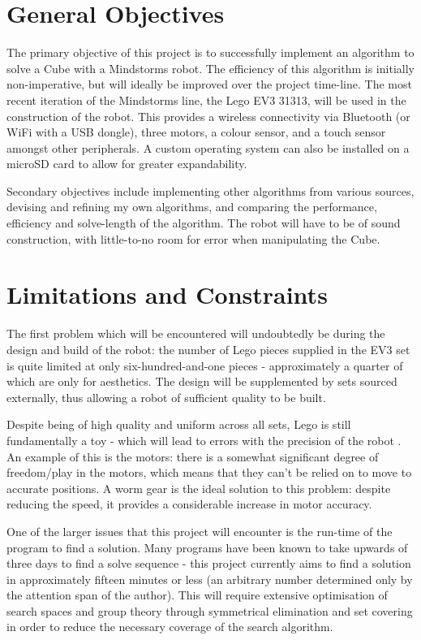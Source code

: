 \documentclass{report}
\begin{document}
    \section{General Objectives}
    The primary objective of this project is to successfully implement an algorithm to solve a Cube with a Mindstorms robot. The efficiency of this algorithm is initially non-imperative, but will ideally be improved over the project time-line. The most recent iteration of the Mindstorms line, the Lego EV3 31313, will be used in the construction of the robot. This provides a wireless connectivity via Bluetooth (or WiFi with a USB dongle), three motors, a colour sensor, and a touch sensor amongst other peripherals. A custom operating system can also be installed on a microSD card to allow for greater expandability.
    
    Secondary objectives include implementing other algorithms from various sources, devising and refining my own algorithms, and comparing the performance, efficiency and solve-length of the algorithm. The robot will have to be of sound construction, with little-to-no room for error when manipulating the Cube.
    
    \section{Limitations and Constraints}
    The first problem which will be encountered will undoubtedly be during the design and build of the robot: the number of Lego pieces supplied in the EV3 set is quite limited at only six-hundred-and-one pieces - approximately a quarter of which are only for aesthetics. The design will  be supplemented by sets sourced externally, thus allowing a robot of sufficient quality to be built.
    
    Despite being of high quality and uniform across all sets, Lego is still fundamentally a toy - which will lead to errors with the precision of the robot \cite{Cook2017}. An example of this is the motors: there is a somewhat significant degree of freedom/play in the motors, which means that they can't be relied on to move to accurate positions. A worm gear is the ideal solution to this problem: despite reducing the speed, it provides a considerable increase in motor accuracy.
    
    One of the larger issues that this project will encounter is the run-time of the program to find a solution. Many programs have been known to take upwards of three days to find a solve sequence - this project currently aims to find a solution in approximately fifteen minutes or less (an arbitrary number determined only by the attention span of the author). This will require extensive optimisation of search spaces and group theory through symmetrical elimination and set covering in order to reduce the necessary coverage of the search algorithm.
    
\end{document}
